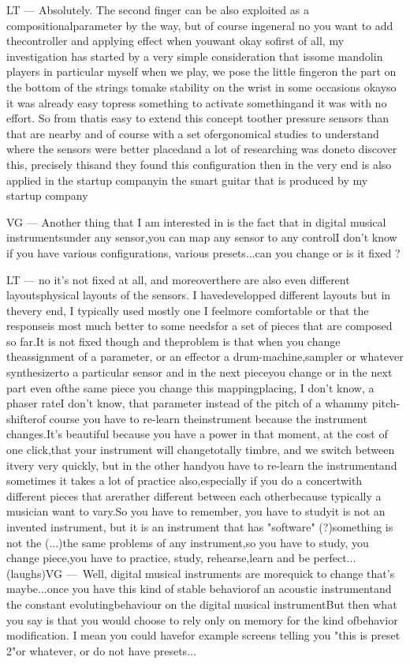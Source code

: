 LT — Absolutely. The second finger can be also exploited as a compositionalparameter by the way, but of course ingeneral no you want to add thecontroller and applying effect when youwant okay sofirst of all, my investigation has started by a very simple consideration that issome mandolin players in particular myself when we play, we pose the little fingeron the part on the bottom of the strings tomake stability on the wrist in some occasions okayso it was already easy topress something to activate somethingand it was with no effort. So from thatis easy to extend this concept toother pressure sensors than that are nearby and of course with a set ofergonomical studies to understand where the sensors were better placedand a lot of researching was doneto discover this, precisely thisand they found this configuration then in the very end is also applied in the startup companyin the smart guitar that is produced by my startup company

VG — Another thing that I am interested in is the fact that in digital musical instrumentsunder any sensor,you can map any sensor to any controlI don't know if you have various configurations, various presets...can you change or is it fixed ?

LT — no it's not fixed at all, and moreoverthere are also even different layoutsphysical layouts of the sensors. I havedevelopped different layouts but in thevery end, I typically used mostly one I feelmore comfortable or that the responseis most much better to some needsfor a set of pieces that are composed so far.It is not fixed though and theproblem is that when you change theassignment of a parameter, or an effector a drum-machine,sampler or whatever synthesizerto a particular sensor and in the next pieceyou change or in the next part even ofthe same piece you change this mappingplacing, I don't know, a phaser rateI don't know, that parameter instead of the pitch of a whammy pitch-shifterof course you have to re-learn theinstrument because the instrument changes.It's beautiful because you have a power in that moment, at the cost of one click,that your instrument will changetotally timbre, and we switch between itvery very quickly, but in the other handyou have to re-learn the instrumentand sometimes it takes a lot of practice also,especially if you do a concertwith different pieces that arerather different between each otherbecause typically a musician want to vary.So you have to remember, you have to studyit is not an invented instrument, but it is an instrument that has "software" (?)something is not the (...)the same problems of any instrument,so you have to study, you change piece,you have to practice, study, rehearse,learn and be perfect... (laughs)VG — Well, digital musical instruments are morequick to change that's maybe...once you have this kind of stable behaviorof an acoustic instrumentand the constant evolutingbehaviour on the digital musical instrumentBut then what you say is that you would choose to rely only on memory for the kind ofbehavior modification. I mean you could havefor example screens telling you "this is preset 2"or whatever, or do not have presets...

